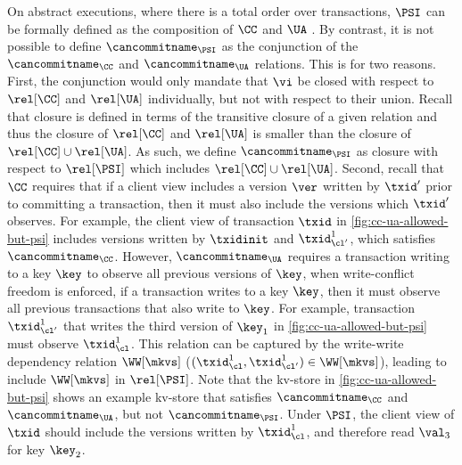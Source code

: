 On abstract executions, where there is a total order over transactions,  
\(\PSI\) can be formally defined as the composition of
 \(\CC\) and \(\UA\) \cite{framework-concur}. By contrast, it is not possible to define \(\cancommitname_{\PSI}\) as
the conjunction of the \(\cancommitname_{\CC}\) and
\(\cancommitname_{\UA}\) relations. 
This is for two reasons. 
First, the conjunction would only mandate that \(\vi\) be closed with respect to 
\(\rel[\CC]\) and \(\rel[\UA]\) {individually}, but {not} with respect to their {union}.
Recall that closure is defined in terms of the transitive closure of a given relation 
and thus the closure of \(\rel[\CC]\) and \(\rel[\UA]\) is smaller than the closure of \(\rel[\CC] \cup \rel[\UA]\).
As such, we define \(\cancommitname_{\PSI}\) as closure with respect to \(\rel[\PSI] \) which includes \( \rel[\CC] \cup \rel[\UA]\).
Second, recall that \(\CC\) requires that
if a client view includes 
a version \(\ver\) written by \( \txid' \) prior to committing a transaction, 
then it must also include the versions which \(\txid'\) observes.
For example, the client view of transaction \( \txid \) in \cref{fig:cc-ua-allowed-but-psi}
includes versions written by \( \txidinit\) and \( \txid^{1}_{\cl'} \),
which satisfies \(\cancommitname_{\CC}\).
However, \(\cancommitname_{\UA}\) requires a transaction writing 
to a key \(\key\) to observe all previous versions of \(\key\),
\ie when write-conflict freedom is enforced, if a transaction writes to a key \( \key \), 
then it must observe all previous transactions that also write to \(\key\).
For example, transaction \( \txid^{1}_{\cl'} \) that writes the third version of \( \key_1 \) in \cref{fig:cc-ua-allowed-but-psi} must observe \( \txid^{1}_{\cl} \). 
This relation can be captured by the write-write dependency relation \(\WW[\mkvs]\) (\eg \( (\txid^{1}_{\cl}, \txid^{1}_{\cl'} ) \in \WW[\mkvs] \)),
leading to include \(\WW[\mkvs]\) in \(\rel[\PSI]\).
Note that the kv-store in \cref{fig:cc-ua-allowed-but-psi} shows an
example kv-store that satisfies \(\cancommitname_{\CC} \) and \( \cancommitname_{\UA}\), 
but not \(\cancommitname_{\PSI}\). 
Under \( \PSI \), the client view of \( \txid \) should include the versions written by \( \txid^{1}_{\cl} \),
and therefore read \( \val_3 \) for key \( \key_2 \).




